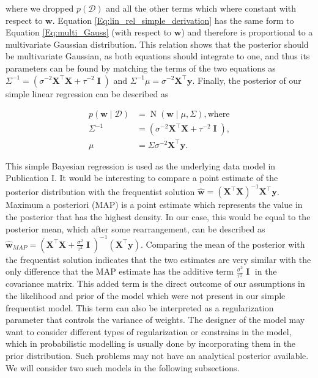 \documentclass[dissertation,math,vertlayout,pdfa,colorlinks]{aaltoseries}
\newcommand{\bw}{\bm{w}}
\newcommand{\bX}{\bm{X}}
\newcommand{\by}{\bm{y}}
\newcommand{\bD}{\mathcal{D}}
\DeclareMathOperator{\eye}{\textbf{I}}
\DeclareMathOperator{\normalpdf}{N}
\newcommand{\tp}{^{\top}}
\begin{document}
\noindent where we dropped $p(\bD)$ and all the other terms which where constant with respect to $\bw$. Equation \ref{Eq:lin_rel_simple_derivation} has the same form to Equation \ref{Eq:multi_Gauss} (with respect to $\bw$) and therefore is proportional to a multivariate Gaussian distribution. This relation shows that the posterior should be multivariate Gaussian, as both equations should integrate to one, and thus its parameters can be found by matching the terms of the two equations as $\Sigma^{-1} = ( \sigma^{-2}\bX\tp\bX + \tau^{-2} \eye ) $ and $\Sigma^{-1}\mu = \sigma^{-2}\bX\tp\by$. Finally, the posterior of our simple linear regression can be described as 

\begin{align}\label{Eq:lin_rel_simple_posterior}
	p(\bw \mid \bD) &= \normalpdf(\bw \mid \mu,\Sigma), \text{where}\\
	\Sigma^{-1} &= (\sigma^{-2}\bX\tp\bX + \tau^{-2} \eye ), \nonumber\\
	\mu &= \Sigma\sigma^{-2}\bX\tp\by. \nonumber
\end{align}

This simple Bayesian regression is used as the underlying data model in Publication I. It would be interesting to compare a point estimate of the posterior distribution with the frequentist solution $\hat{\bw} = (\bX \tp \bX)^{-1}\bX\tp \by$. Maximum a posteriori (MAP) is a point estimate which represents the value in the posterior that has the highest density. In our case, this would be equal to the posterior mean, which after some rearrangement, can be described as $\hat{\bw}_{MAP} = (\bX\tp\bX + \frac{\sigma^{2}}{\tau^{2}} \eye )^{-1}(\bX\tp\by)$. Comparing the mean of the posterior with the frequentist solution indicates that the two estimates are very similar with the only difference that the MAP estimate has the additive term $\frac{\sigma^{2}}{\tau^{2}} \eye$ in the covariance matrix. This added term is the direct outcome of our assumptions in the likelihood and prior of the model which were not present in our simple frequentist model. This term can also be interpreted as a regularization parameter that controls the variance of weights. The designer of the model may want to consider different types of regularization or constrains in the model, which in probabilistic modelling is usually done by incorporating them in the prior distribution. Such problems may not have an analytical posterior available. We will consider two such models in the following subsections.
\end{document}
